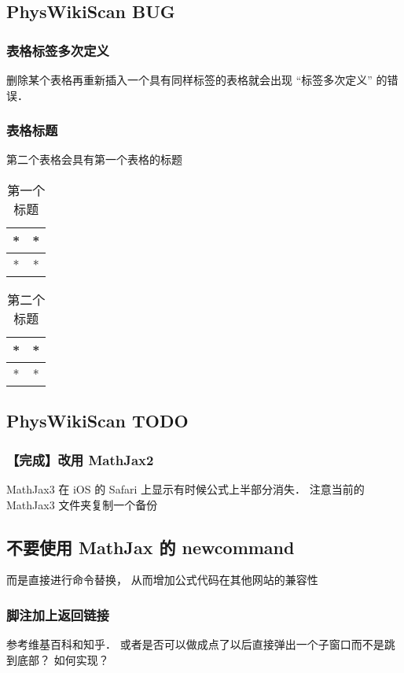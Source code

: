 \begin{itemize}
\end{itemize}

\subsection{PhysWikiScan BUG}

\subsubsection{表格标签多次定义}
删除某个表格再重新插入一个具有同样标签的表格就会出现 “标签多次定义” 的错误．

\subsubsection{表格标题}
第二个表格会具有第一个表格的标题
\begin{table}[ht]
\centering
\caption{第一个标题}\label{edTODO_tab2}
\begin{tabular}{|c|c|}
\hline
* & * \\
\hline
* & * \\
\hline
\end{tabular}
\end{table}

\begin{table}[ht]
\centering
\caption{第二个标题}\label{edTODO_tab3}
\begin{tabular}{|c|c|}
\hline
* & * \\
\hline
* & * \\
\hline
\end{tabular}
\end{table}

\subsection{PhysWikiScan TODO}

\subsubsection{【完成】改用 MathJax2}
MathJax3 在 iOS 的 Safari 上显示有时候公式上半部分消失． 注意当前的 MathJax3 文件夹复制一个备份

\subsection{不要使用 MathJax 的 newcommand}
而是直接进行命令替换， 从而增加公式代码在其他网站的兼容性

\subsubsection{脚注加上返回链接}
参考维基百科和知乎． 或者是否可以做成点了以后直接弹出一个子窗口而不是跳到底部？ 如何实现？
